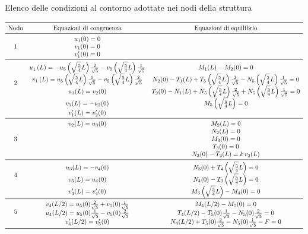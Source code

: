 \begin{table}[htb]
\footnotesize
\caption{Elenco delle condizioni al contorno adottate nei nodi della struttura}
\label{tab:EqContornoLineaElastica}
\centering
\[
\begin{array}{ccc}
\toprule	
\text{Nodo} & \text{Equazioni di congruenza} & \text{Equazioni di equilibrio} \\\midrule
\multirow{3}{*}{1} & u_1(0)=0 & \\
 & v_1(0)=0 & \\
 & v_1^\prime(0)=0 & \\\midrule
\multirow{5}{*}{2} & u_1\left(L\right)=-u_5\left(\sqrt{\frac{5}{4}}L\right)\frac{2}{\sqrt{5}} - v_5\left(\sqrt{\frac{5}{4}}L\right)\frac{1}{\sqrt{5}} & M_1(L) - M_2(0) =0\\
 & v_1\left(L\right)=u_5\left(\sqrt{\frac{5}{4}}L\right)\frac{1}{\sqrt{5}} - v_5\left(\sqrt{\frac{5}{4}}L\right)\frac{2}{\sqrt{5}} & N_2(0) - T_1(L) + T_5\left(\sqrt{\frac{5}{4}}L\right)\frac{2}{\sqrt{5}} - N_5\left(\sqrt{\frac{5}{4}}L\right)\frac{1}{\sqrt{5}}=0\\
 & u_1(L) = v_2(0) & T_2(0) - N_1(L) + N_5\left(\sqrt{\frac{5}{4}}L\right)\frac{2}{\sqrt{5}} + N_5\left(\sqrt{\frac{5}{4}}L\right)\frac{1}{\sqrt{5}}=0\\
 & v_1(L) = -u_2(0) & M_5\left(\sqrt{\frac{5}{4}}L\right)=0\\
 & v_1^\prime(L) = v_2^\prime(0) & \\\midrule
\multirow{5}{*}{3} & v_2(L) = u_3(0) & M_2(L)=0\\
 & & N_2(L)=0 \\
 & & M_3(0)=0 \\
 & & T_3(0)=0 \\
 & & N_3(0) - T_2(L) = k\, v_2(L)\\\midrule
\multirow{3}{*}{4} & u_3(L) = -v_4(0) & N_3(0)+T_4\left(\sqrt{\frac{5}{4}}L\right)=0 \\
 & v_3(L) = u_4(0) & N_4(0)-T_3\left(\sqrt{\frac{5}{4}}L\right)=0 \\
 & v_3^\prime(L) = v_4^\prime(0) & M_3\left(\sqrt{\frac{5}{4}}L\right)-M_4(0)=0 \\\midrule
\multirow{3}{*}{5} & v_4(L/2) = u_5(0)\frac{2}{\sqrt{5}} + v_5(0)\frac{1}{\sqrt{5}} & M_4(L/2) - M_5(0)=0\\
 & u_4(L/2) = u_5(0)\frac{1}{\sqrt{5}} - v_5(0)\frac{2}{\sqrt{5}} & T_4(L/2)-T_5(0)\frac{1}{\sqrt{5}} - N_5(0)\frac{2}{\sqrt{5}}=0\\
 & v_4^\prime(L/2) = v_5^\prime(0) & N_4(L/2)+T_5(0)\frac{2}{\sqrt{5}}-N_5(0)\frac{1}{\sqrt{5}}-F=0\\
\bottomrule
\end{array}
\]
\end{table}